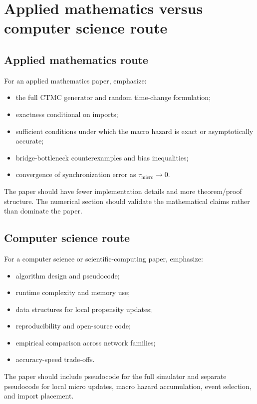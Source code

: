 \documentclass[12pt,a4paper]{article}
\theoremstyle{definition}
\newcommand{\1}{\mathbf{1}}
\begin{document}
\section{Applied mathematics versus computer science route}

\subsection{Applied mathematics route}

For an applied mathematics paper, emphasize:
\begin{itemize}
    \item the full CTMC generator and random time-change formulation;
    \item exactness conditional on imports;
    \item sufficient conditions under which the macro hazard is exact or asymptotically accurate;
    \item bridge-bottleneck counterexamples and bias inequalities;
    \item convergence of synchronization error as $\tau_{\mathrm{micro}}\to 0$.
\end{itemize}

The paper should have fewer implementation details and more theorem/proof structure.  The numerical section should validate the mathematical claims rather than dominate the paper.

\subsection{Computer science route}

For a computer science or scientific-computing paper, emphasize:
\begin{itemize}
    \item algorithm design and pseudocode;
    \item runtime complexity and memory use;
    \item data structures for local propensity updates;
    \item reproducibility and open-source code;
    \item empirical comparison across network families;
    \item accuracy-speed trade-offs.
\end{itemize}

The paper should include pseudocode for the full simulator and separate pseudocode for local micro updates, macro hazard accumulation, event selection, and import placement.
\end{document}
